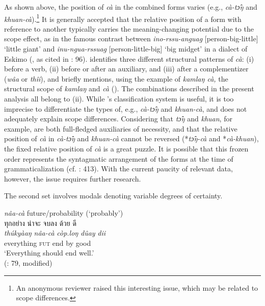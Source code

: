 \documentclass[output=paper,colorlinks,citecolor=brown]{langscibook}
\begin{document}
As shown above, the position of \textit{cà} in the combined forms varies (e.g., \textit{cà-tɔ̂ŋ} and \textit{khuan-cà}).\footnote{An anonymous reviewer raised this interesting issue, which may be related to scope differences.} It is generally accepted that the relative position of a form with reference to another typically carries the meaning-changing potential due to the scope effect, as in the famous contrast between \textit{ino-rssu-anguag} [person-big-little] ‘little giant’ and \textit{inu-ngua-rssuag} [person-little-big] ‘big midget’ in a dialect of Eskimo (\cite{SadockOlsen1976}, as cited in \cite{Bybee1985}: 96). \citet[]{Soithurum2010} identifies three different structural patterns of \textit{cà}: (i) before a verb, (ii) before or after an auxiliary, and (iii) after a complementizer (\textit{wâa} or \textit{thîi}), and briefly mentions, using the example of \textit{kamlaŋ cà, }the structural scope of \textit{kamlaŋ }and\textit{ cà }(\cite[72, 76]{Soithurum2010}). The combinations described in the present analysis all belong to (ii). While \citeauthor{Soithurum2010}'s classification system is useful, it is too imprecise to differentiate the types of, e.g., \textit{cà-tɔ̂ŋ} and \textit{khuan-cà}, and does not adequately explain scope differences. Considering that \textit{tɔ̂ŋ} and \textit{khuan}, for example, are both full-fledged auxiliaries of necessity, and that the relative position of \textit{cà }in \textit{cà-tɔ̂ŋ} and \textit{khuan-cà} cannot be reversed (*\textit{tɔ̂ŋ-cà} and *\textit{cà-khuan}), the fixed relative position of \textit{cà }is a great puzzle. It is possible that this frozen order represents the syntagmatic arrangement of the forms at the time of grammaticalization (cf. \cite{Givon1971}: 413). With the current paucity of relevant data, however, the issue requires further research.

The second set involves modals denoting variable degrees of certainty. 


\ea \label{ex:7}
    \ea \label{ex:7a} \textit{nâa-cà} future/probability (‘probably’)\\
        \textthai{ทุกอย่าง} \textthai{น่าจะ} \textthai{จบลง} \textthai{ด้วย} \textthai{ดี}\\
        \gll \textit{thúkyàaŋ} \textit{nâa-cà} \textit{còp.loŋ} \textit{dûay} \textit{dii}\\
        everything \textsc{fut} end by good\\
        \glt ‘Everything should end well.’ \\
        \hfill (\cite{Soithurum2010}: 79, modified)
\end{document}
